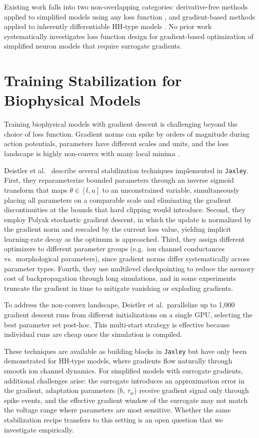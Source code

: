 Existing work falls into two non-overlapping categories: derivative-free methods applied to simplified models using any loss function \cite{Guarino2025, Marin2020, Cruz2021}, and gradient-based methods applied to inherently differentiable \gls{HH}-type models \cite{Deistler2025, Jones2024}.
No prior work systematically investigates loss function design for gradient-based optimization of simplified neuron models that require surrogate gradients.

\section{Training Stabilization for Biophysical Models}\label{sec:rw:training-stab}

Training biophysical models with gradient descent is challenging beyond the choice of loss function.
Gradient norms can spike by orders of magnitude during action potentials, parameters have different scales and units, and the loss landscape is highly non-convex with many local minima \cite{Deistler2025}.

Deistler et al.\ \cite{Deistler2025} describe several stabilization techniques implemented in \texttt{Jaxley}.
First, they reparameterize bounded parameters through an inverse sigmoid transform that maps $\theta \in [l, u]$ to an unconstrained variable, simultaneously placing all parameters on a comparable scale and eliminating the gradient discontinuities at the bounds that hard clipping would introduce.
Second, they employ Polyak stochastic gradient descent, in which the update is normalized by the gradient norm and rescaled by the current loss value, yielding implicit learning-rate decay as the optimum is approached.
Third, they assign different optimizers to different parameter groups (e.g.\ ion channel conductances vs.\ morphological parameters), since gradient norms differ systematically across parameter types.
Fourth, they use multilevel checkpointing to reduce the memory cost of backpropagation through long simulations, and in some experiments truncate the gradient in time to mitigate vanishing or exploding gradients.

To address the non-convex landscape, Deistler et al.\ parallelize up to 1,000 gradient descent runs from different initializations on a single GPU, selecting the best parameter set post-hoc.
This multi-start strategy is effective because individual runs are cheap once the simulation is compiled.

These techniques are available as building blocks in \texttt{Jaxley} but have only been demonstrated for \gls{HH}-type models, where gradients flow naturally through smooth ion channel dynamics.
For simplified models with surrogate gradients, additional challenges arise: the surrogate introduces an approximation error in the gradient, adaptation parameters ($b$, $\tau_w$) receive gradient signal only through spike events, and the effective gradient window of the surrogate may not match the voltage range where parameters are most sensitive.
Whether the same stabilization recipe transfers to this setting is an open question that we investigate empirically.

